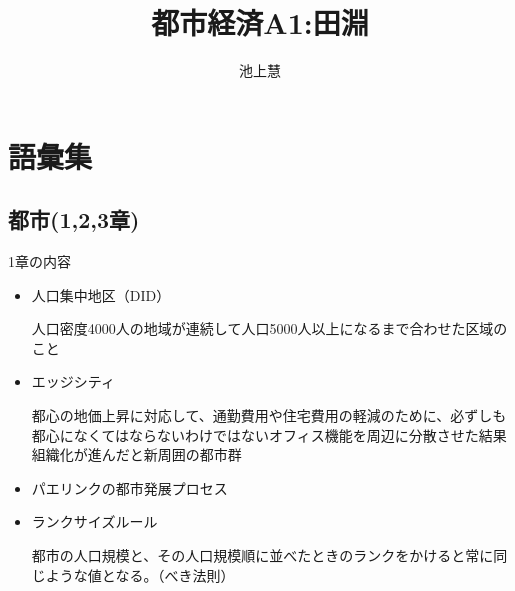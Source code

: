 \documentclass{jsarticle}
\begin{document}
\title{都市経済A1:田淵}
\author{池上慧}
\maketitle

\section{語彙集}
\subsection{都市(1,2,3章)}
1章の内容
\begin{itemize}
\item 人口集中地区（DID）

人口密度4000人の地域が連続して人口5000人以上になるまで合わせた区域のこと
\item エッジシティ

都心の地価上昇に対応して、通勤費用や住宅費用の軽減のために、必ずしも都心になくてはならないわけではないオフィス機能を周辺に分散させた結果組織化が進んだと新周囲の都市群
\item パエリンクの都市発展プロセス
\item ランクサイズルール

都市の人口規模と、その人口規模順に並べたときのランクをかけると常に同じような値となる。（べき法則）
\end{itemize}
\end{document}
